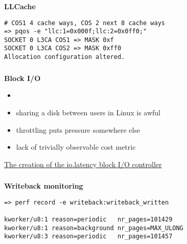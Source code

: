 \documentclass[usenames,dvipsnames, 18pt, compress, aspectratio=169]{beamer}
\begin{document}
\begin{frame}[fragile]{}
    \frametitle{}
    \begin{center}
        \textbf{LLCache}

        \begin{flushleft}
		\begin{verbatim}
# COS1 4 cache ways, COS 2 next 8 cache ways
=> pqos -e "llc:1=0x000f;llc:2=0x0ff0;"
SOCKET 0 L3CA COS1 => MASK 0xf
SOCKET 0 L3CA COS2 => MASK 0xff0
Allocation configuration altered.
        \end{verbatim}
        \end{flushleft}

    \end{center}
\end{frame}

\begin{frame}
    \frametitle{}
    \begin{center}
    \textbf{Block I/O}

            \begin{itemize}
                \item <+->
            \end{itemize}

            \begin{itemize}[label={\MVRightarrow}]
                \item<+-> sharing a disk between users in Linux is awful
                \item<+-> throttling puts pressure somewhere else
                \item<+-> lack of trivially observable cost metric
            \end{itemize}

        \normalsize{\href{https://lwn.net/Articles/782876/}
                   {\color{black}The creation of the io.latency block I/O controller}}

    \end{center}
\end{frame}

\begin{frame}[fragile]{}
    \frametitle{}
    \begin{center}
        \textbf{Writeback monitoring}

        \begin{flushleft}
        \begin{verbatim}
=> perf record -e writeback:writeback_written

kworker/u8:1 reason=periodic   nr_pages=101429
kworker/u8:1 reason=background nr_pages=MAX_ULONG
kworker/u8:3 reason=periodic   nr_pages=101457
        \end{verbatim}
        \end{flushleft}

    \end{center}
\end{frame}
\end{document}
